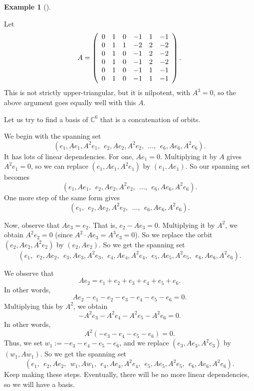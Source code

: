 \documentclass[numbers=enddot,12pt,final,onecolumn,notitlepage]{scrartcl}%
\numberwithin{exer}{subsection}
\theoremstyle{definition}
\newtheorem{exam}[theo]{Example}
\newenvironment{example}[1][]
{\begin{exam}[#1]\begin{leftbar}}
{\end{leftbar}\end{exam}}
\begin{document}
\begin{example}
Let
\[
A=\left(
\begin{array}
[c]{cccccc}%
0 & 1 & 0 & -1 & 1 & -1\\
0 & 1 & 1 & -2 & 2 & -2\\
0 & 1 & 0 & -1 & 2 & -2\\
0 & 1 & 0 & -1 & 2 & -2\\
0 & 1 & 0 & -1 & 1 & -1\\
0 & 1 & 0 & -1 & 1 & -1
\end{array}
\right)  .
\]
This is not strictly upper-triangular, but it is nilpotent, with $A^{3}=0$, so
the above argument goes equally well with this $A$. 

Let us try to find a basis of $\mathbb{C}^{6}$ that is a concatenation of orbits.

We begin with the spanning set%
\[
\left(  e_{1},Ae_{1},A^{2}e_{1},\ \ e_{2},Ae_{2},A^{2}e_{2},\ \ \ldots
,\ \ e_{6},Ae_{6},A^{2}e_{6}\right)  .
\]
It has lots of linear dependencies. For one, $Ae_{1}=0$. Multiplying it by $A$
gives $A^{2}e_{1}=0$, so we can replace $\left(  e_{1},Ae_{1},A^{2}%
e_{1}\right)  $ by $\left(  e_{1},Ae_{1}\right)  $. So our spanning set
becomes%
\[
\left(  e_{1},Ae_{1},\ \ e_{2},Ae_{2},A^{2}e_{2},\ \ \ldots,\ \ e_{6}%
,Ae_{6},A^{2}e_{6}\right)  .
\]
One more step of the same form gives%
\[
\left(  e_{1},\ \ e_{2},Ae_{2},A^{2}e_{2},\ \ \ldots,\ \ e_{6},Ae_{6}%
,A^{2}e_{6}\right)  .
\]


Now, observe that $Ae_{3}=e_{2}$. That is, $e_{2}-Ae_{3}=0$. Multiplying it by
$A^{2}$, we obtain $A^{2}e_{2}=0$ (since $A^{2}\cdot Ae_{3}=A^{3}e_{3}=0$). So
we replace the orbit $\left(  e_{2},Ae_{2},A^{2}e_{2}\right)  $ by $\left(
e_{2},Ae_{2}\right)  $. So we get the spanning set
\[
\left(  e_{1},\ \ e_{2},Ae_{2},\ \ e_{3},Ae_{3},A^{2}e_{3},\ \ e_{4}%
,Ae_{4},A^{2}e_{4},\ \ e_{5},Ae_{5},A^{2}e_{5},\ \ e_{6},Ae_{6},A^{2}%
e_{6}\right)  .
\]


We observe that%
\[
Ae_{2}=e_{1}+e_{2}+e_{3}+e_{4}+e_{5}+e_{6}.
\]
In other words,%
\[
Ae_{2}-e_{1}-e_{2}-e_{3}-e_{4}-e_{5}-e_{6}=0.
\]
Multiplying this by $A^{2}$, we obtain%
\[
-A^{2}e_{3}-A^{2}e_{4}-A^{2}e_{5}-A^{2}e_{6}=0.
\]
In other words,%
\[
A^{2}\left(  -e_{3}-e_{4}-e_{5}-e_{6}\right)  =0.
\]
Thus, we set $w_{1}:=-e_{3}-e_{4}-e_{5}-e_{6}$, and we replace $\left(
e_{3},Ae_{3},A^{2}e_{3}\right)  $ by $\left(  w_{1},Aw_{1}\right)  $. So we
get the spanning set
\[
\left(  e_{1},\ \ e_{2},Ae_{2},\ \ w_{1},Aw_{1},\ \ e_{4},Ae_{4},A^{2}%
e_{4},\ \ e_{5},Ae_{5},A^{2}e_{5},\ \ e_{6},Ae_{6},A^{2}e_{6}\right)  .
\]
Keep making these steps. Eventually, there will be no more linear
dependencies, so we will have a basis.
\end{example}
\end{document}
